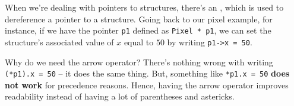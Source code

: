 When we're dealing with pointers to structures, there's an , which is used to dereference a pointer to a structure. Going back to our pixel example, for instance, if we have the pointer \verb!p1! defined as \verb!Pixel * p1!, we can set the structure's associated value of $x$ equal to $50$ by writing \verb!p1->x = 50!. 


Why do we need the arrow operator? There's nothing wrong with writing \texttt{(*p1).x = 50} -- it does the same thing. But, something like \texttt{*p1.x = 50} \textbf{does not work} for precedence reasons. Hence, having the arrow operator improves readability instead of having a lot of parentheses and astericks. 